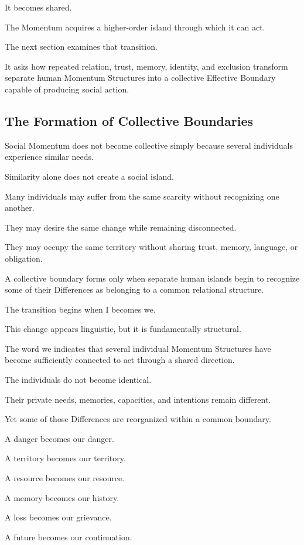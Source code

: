 It becomes shared.

The Momentum acquires a higher-order island through which it can act.

The next section examines that transition.

It asks how repeated relation, trust, memory, identity, and exclusion transform separate human Momentum Structures into a collective Effective Boundary capable of producing social action.

\subsection*{\textbf{The Formation of Collective Boundaries}}


Social Momentum does not become collective simply because several individuals experience similar needs.

Similarity alone does not create a social island.

Many individuals may suffer from the same scarcity without recognizing one another.

They may desire the same change while remaining disconnected.

They may occupy the same territory without sharing trust, memory, language, or obligation.

A collective boundary forms only when separate human islands begin to recognize some of their Differences as belonging to a common relational structure.

The transition begins when I becomes we.

This change appears linguistic, but it is fundamentally structural.

The word we indicates that several individual Momentum Structures have become sufficiently connected to act through a shared direction.

The individuals do not become identical.

Their private needs, memories, capacities, and intentions remain different.

Yet some of those Differences are reorganized within a common boundary.

A danger becomes our danger.

A territory becomes our territory.

A resource becomes our resource.

A memory becomes our history.

A loss becomes our grievance.

A future becomes our continuation.

